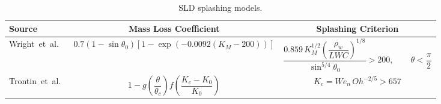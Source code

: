 
\begin{table}[htb!]
\centering
\caption{SLD splashing models.}
\label{tab:splashing_ModelsLitRev}
\small
\begin{adjustbox}{max width=\textwidth}
\begin{tabular}{lcc}
\hline \hline
\textbf{Source} &
\textbf{Mass Loss Coefficient} &
\textbf{Splashing Criterion} \\
\midrule




\mbox{Wright et al.~\cite{wright2004semi}}
&
$0.7(1-\sin\theta_0)
\left[1-\exp\left(-0.0092(K_M-200)\right)\right]$
&
$\dfrac{
0.859\,K_M^{1/2}
\left(\dfrac{\rho_w}{LWC}\right)^{1/8}}
{\sin^{5/4}\theta_0}
>200,
\qquad
\theta<\dfrac{\pi}{2}$
\\[0.8em]

\mbox{Trontin et al.~\cite{trontin2016revisited}}
&
$1-
g\!\left(\dfrac{\theta}{\theta_c}\right)
f\!\left(\dfrac{K_c-K_0}{K_0}\right)$
&
$K_c=We_n\,Oh^{-2/5}>657$
\\

\hline \hline
\end{tabular}
\end{adjustbox}
\end{table}

